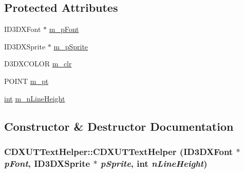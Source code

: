 \subsection*{Protected Attributes}
\begin{DoxyCompactItemize}
\item 
ID3DXFont $\ast$ \hyperlink{class_c_d_x_u_t_text_helper_abf9fdc2bdca1ef2ff43a054a98ee8fe9}{m\_\-pFont}
\item 
ID3DXSprite $\ast$ \hyperlink{class_c_d_x_u_t_text_helper_a3c32e301254b6f5473c370b4c567b53b}{m\_\-pSprite}
\item 
D3DXCOLOR \hyperlink{class_c_d_x_u_t_text_helper_abda1eaccbab210b030c9386f73462502}{m\_\-clr}
\item 
POINT \hyperlink{class_c_d_x_u_t_text_helper_af7ee38b69c0c1686a73cb9f52ea492a7}{m\_\-pt}
\item 
\hyperlink{_d_x_u_tgui_8cpp_a2d77ed03302b6978834ee3b6f57837fb}{int} \hyperlink{class_c_d_x_u_t_text_helper_a2ac874c5600959730dfb09c17ac88dc2}{m\_\-nLineHeight}
\end{DoxyCompactItemize}


\subsection{Constructor \& Destructor Documentation}
\hypertarget{class_c_d_x_u_t_text_helper_a7ddd666bfdc63ecd39d80516a45e2924}{
\subsubsection[{CDXUTTextHelper}]{\setlength{\rightskip}{0pt plus 5cm}CDXUTTextHelper::CDXUTTextHelper (ID3DXFont $\ast$ {\em pFont}, \/  ID3DXSprite $\ast$ {\em pSprite}, \/  {\bf int} {\em nLineHeight})}}
\label{class_c_d_x_u_t_text_helper_a7ddd666bfdc63ecd39d80516a45e2924}


